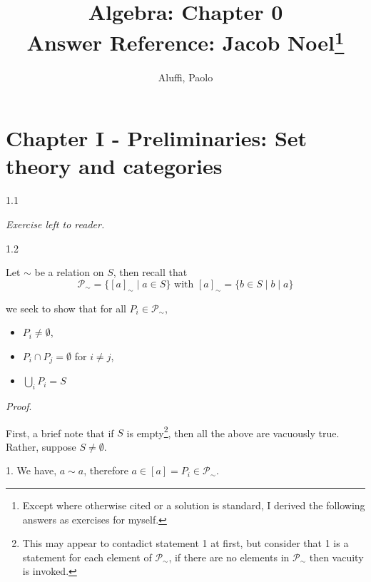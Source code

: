 \documentclass[letterpaper,12pt]{article}
\theoremstyle{definition}
\begin{document}
\title{Algebra: Chapter 0 \\ {\small Answer Reference: Jacob Noel\footnote{Except where otherwise cited or a solution is standard, I derived the following answers as exercises for myself.}}}
\author{Aluffi, Paolo}


{\let\newpage\relax\maketitle}


\pagebreak
\section*{Chapter I - Preliminaries: Set theory and categories}

\begin{flushleft}
	1.1
\end{flushleft}

\begin{center}
    \textit{Exercise left to reader.}
\end{center}

\begin{flushleft}
	1.2
\end{flushleft}

Let $\sim$ be a relation on $S$, then recall that $$\mathcal{P}_\sim = \{[a]_\sim \mid a \in S\} \text{ with } [a]_\sim = \{b \in S \mid b \mid a\}$$

we seek to show that for all $P_i \in \mathcal{P}_\sim$, 

\begin{itemize}[noitemsep]
    \item [1.] $P_i \neq \emptyset$,
    \item [2.] $P_i \cap P_j = \emptyset$ for $i \neq j$,
    \item [3.] $\bigcup_{i}P_i = S$
\end{itemize}

\textit{Proof}.

First, a brief note that if $S$ is empty\footnote{This may appear to contadict statement 1 at first, but consider that 1 is a statement for each element of $\mathcal{P}_\sim$, if there are no elements in $\mathcal{P}_\sim$ then vacuity is invoked.}, then all the above are vacuously true. Rather, suppose $S \neq \emptyset$. 

1. We have, $a \sim a$, therefore $a \in [a] = P_i \in \mathcal{P}_\sim$. 
\end{document}
